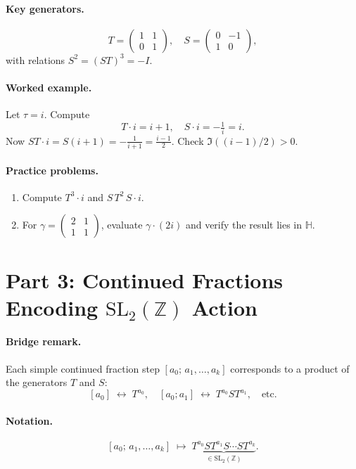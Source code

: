 \documentclass[11pt]{article}
\begin{document}
\paragraph{Key generators.}
\[
T = \begin{pmatrix}1&1\\0&1\end{pmatrix},\quad
S = \begin{pmatrix}0&-1\\1&0\end{pmatrix},
\]
with relations \(S^2 = (ST)^3 = -I\).

\paragraph{Worked example.}
Let \(\tau = i\).  Compute
\[
T\cdot i = i + 1,\quad
S\cdot i = -\tfrac1{i} = i.
\]
Now \(\displaystyle ST\cdot i = S(i+1)= -\tfrac1{i+1} = \frac{i-1}{2}\).  Check \(\Im((i-1)/2)>0\).

\paragraph{Practice problems.}
\begin{enumerate}
  \item Compute \(\displaystyle T^3\cdot i\) and \(S\,T^2\,S\cdot i\).
  \item For \(\gamma=\begin{pmatrix}2&1\\1&1\end{pmatrix}\), evaluate \(\gamma\cdot(2i)\) and verify the result lies in \(\mathbb{H}\).
\end{enumerate}

\newpage
\section*{Part 3: Continued Fractions Encoding \(\mathrm{SL}_2(\mathbb{Z})\) Action}

\paragraph{Bridge remark.}
Each simple continued fraction step
\([a_0;\,a_1,\dots,a_k]\)
corresponds to a product of the generators \(T\) and \(S\):
\[
[a_0] \;\longleftrightarrow\; T^{a_0}, 
\quad
[a_0;a_1] \;\longleftrightarrow\; T^{a_0}S T^{a_1}, 
\quad\text{etc.}
\]

\paragraph{Notation.}
\[
[a_0;\,a_1,\ldots,a_k]
\;\longmapsto\;
\underbrace{T^{a_0}S T^{a_1}S\cdots S T^{a_k}}_{\in\mathrm{SL}_2(\mathbb{Z})}.
\]
\end{document}
